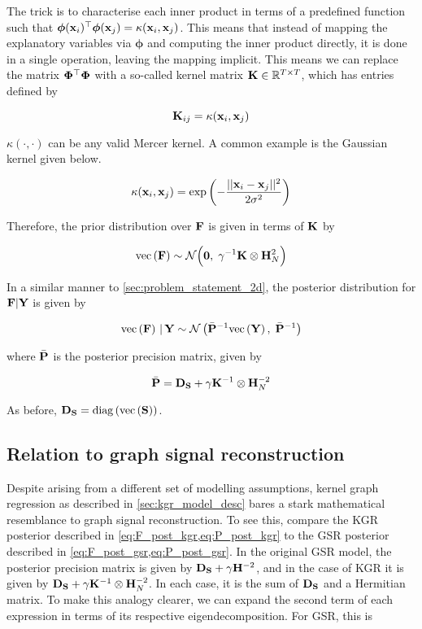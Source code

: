 The trick is to characterise each inner product in terms of a predefined function such that $\boldsymbol{\phi}(\mathbf{x}_i)^\top\boldsymbol{\phi}(\mathbf{x}_j) = \kappa(\mathbf{x}_i, \mathbf{x}_j)$. This means that instead of mapping the explanatory variables via $\boldsymbol{\phi}$ and computing the inner product directly, it is done in a single operation, leaving the mapping implicit. This means we can replace the matrix $\mathbf{\Phi}^\top \mathbf{\Phi}$ with a so-called kernel matrix $\mathbf{K} \in \mathbb{R}^{T \times T}$, which has entries defined by 

\begin{equation}
    \mathbf{K}_{ij} =  \kappa(\mathbf{x}_i, \mathbf{x}_j)
\end{equation}

$\kappa(\cdot, \cdot)$ can be any valid Mercer kernel. A common example is the Gaussian kernel given below. 

\begin{equation}
    \kappa(\mathbf{x}_i, \mathbf{x}_j) = \exp\left(-\frac{|| \mathbf{x}_i - \mathbf{x}_j ||^2}{2 \sigma^2}\right)
\end{equation}

Therefore, the prior distribution over $\mathbf{F}$ is given in terms of $\mathbf{K}$ by 

\begin{equation}
    \label{eq:F_prior3}
    \text{\textup{vec}}\left(\mathbf{F}\right) \sim \mathcal{N}\Big(\mathbf{0}, \; \gamma^{-1} \mathbf{K} \otimes \mathbf{H}_N^{2}\Big)
\end{equation}

In a similar manner to \cref{sec:problem_statement_2d}, the posterior distribution for $\mathbf{F} | \mathbf{Y}$ is given by 

\begin{equation}
    \label{eq:F_post_kgr}
    \text{\textup{vec}}\left(\mathbf{F}\right) \, | \, \mathbf{Y} \sim \mathcal{N}\left(\bar{\mathbf{P}}^{-1}\text{\textup{vec}}\left(\mathbf{Y}\right), \; \bar{\mathbf{P}}^{-1}\right)
\end{equation}

where $\bar{\mathbf{P}}$ is the posterior precision matrix, given by

\begin{equation}
    \label{eq:P_post_kgr}
    \bar{\mathbf{P}} = \mathbf{D}_{\mathbf{S}} + \gamma \mathbf{K}^{-1} \otimes \mathbf{H}_N^{-2}
\end{equation}

As before, $\mathbf{D}_{\mathbf{S}} = \text{\textup{diag}}\left(\text{\textup{vec}}\left(\mathbf{S}\right)\right)$. 

\subsection{Relation to graph signal reconstruction}

Despite arising from a different set of modelling assumptions, kernel graph regression as described in \cref{sec:kgr_model_desc} bares a stark mathematical resemblance to graph signal reconstruction.  To see this, compare the KGR posterior described in \cref{eq:F_post_kgr,eq:P_post_kgr} to the GSR posterior described in \cref{eq:F_post_gsr,eq:P_post_gsr}. In the original GSR model, the posterior precision matrix is given by $\mathbf{D}_{\mathbf{S}} + \gamma \mathbf{H}^{-2}$, and in the case of KGR it is given by $\mathbf{D}_{\mathbf{S}} + \gamma \mathbf{K}^{-1} \otimes \mathbf{H}_N^{-2}$. In each case, it is the sum of $\mathbf{D}_{\mathbf{S}}$ and a Hermitian matrix. To make this analogy clearer, we can expand the second term of each expression in terms of its respective eigendecomposition. For GSR, this is

